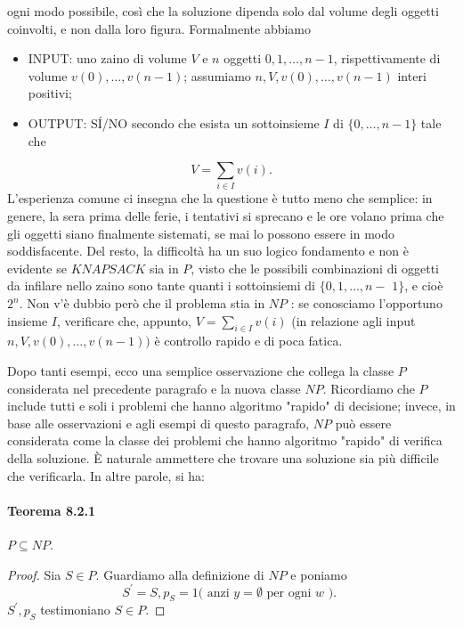 \begin{enumerate}
          ogni modo possibile, così che la soluzione dipenda solo dal volume
          degli oggetti coinvolti, e non dalla loro figura. Formalmente abbiamo
          \begin{itemize}
              \item INPUT: uno zaino di volume $V$ e $n$ oggetti $0,1, \ldots,
                        n-1$, rispettivamente di volume $v(0), \ldots, v(n-1)$; assumiamo
                    $n, V, v(0), \ldots, v(n-1)$ interi positivi;
              \item OUTPUT: SÍ/NO secondo che esista un sottoinsieme $I$ di
                    $\{0, \ldots, n-1\}$ tale che
          \end{itemize}
          $$
              V=\sum_{i \in I} v(i) .
          $$
          L'esperienza comune ci insegna che la questione è tutto meno che
          semplice: in genere, la sera prima delle ferie, i tentativi si
          sprecano e le ore volano prima che gli oggetti siano finalmente
          sistemati, se mai lo possono essere in modo soddisfacente. Del resto,
          la difficoltà ha un suo logico fondamento e non è evidente se $K N A P
              S A C K$ sia in $P$, visto che le possibili combinazioni di oggetti da
          infilare nello zaino sono tante quanti i sottoinsiemi di $\{0,1,
              \ldots, n-$ $1\}$, e cioè $2^n$. Non v'è dubbio però che il problema
          stia in $N P$ : se conosciamo l'opportuno insieme $I$, verificare che,
          appunto, $V=\sum_{i \in I} v(i)$ (in relazione agli input $n, V, v(0),
              \ldots, v(n-1))$ è controllo rapido e di poca fatica.
\end{enumerate}

Dopo tanti esempi, ecco una semplice osservazione che collega la classe $P$
considerata nel precedente paragrafo e la nuova classe $N P$. Ricordiamo che $P$
include tutti e soli i problemi che hanno algoritmo "rapido" di decisione;
invece, in base alle osservazioni e agli esempi di questo paragrafo, $N P$ può
essere considerata come la classe dei problemi che hanno algoritmo "rapido" di
verifica della soluzione. È naturale ammettere che trovare una soluzione sia più
difficile che verificarla. In altre parole, si ha:

\paragraph{Teorema 8.2.1} $P \subseteq N P$.

\begin{proof}
    Sia $S \in P$. Guardiamo alla definizione di $N P$ e poniamo
    $$
        S^{\prime}=S, p_S=1(\text { anzi } y=\emptyset \text { per ogni } w \text { ). }
    $$
    $S^{\prime}, p_S$ testimoniano $S \in P$.
\end{proof}


